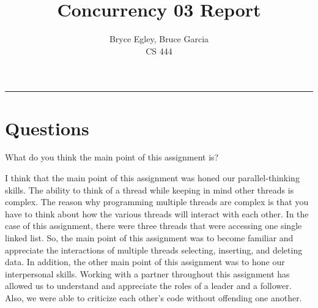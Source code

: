 \documentclass{article}
\newenvironment{question}[2][Question]{\begin{trivlist}
\item[\hskip \labelsep {\bfseries #1}\hskip \labelsep {\bfseries #2.}]}{\end{trivlist}}
\begin{document}

\title{Concurrency 03 Report} %
\author{Bryce Egley, Bruce Garcia\\CS 444} %

\maketitle
\hrule


%
%

\section*{Questions}

\begin{question}{1}
What do you think the main point of this assignment is?
\end{question}
I think that the main point of this assignment was honed our parallel-thinking skills. The ability to think of a thread while keeping in mind other threads is complex. The reason why programming multiple threads are complex is that you have to think about how the various threads will interact with each other. In the case of this assignment, there were three threads that were accessing one single linked list. So, the main point of this assignment was to become familiar and appreciate the interactions of multiple threads selecting, inserting, and deleting data. In addition, the other main point of this assignment was to hone our interpersonal skills. Working with a partner throughout this assignment has allowed us to understand and appreciate the roles of a leader and a follower. Also, we were able to criticize each other's code without offending one another.
\end{document}
